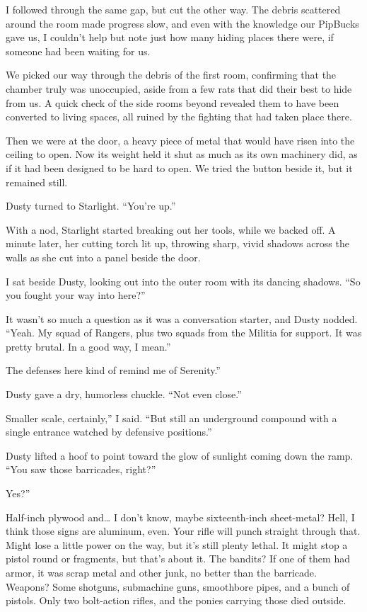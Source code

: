 I followed through the same gap, but cut the other way. The debris scattered around the room made progress slow, and even with the knowledge our PipBucks gave us, I couldn’t help but note just how many hiding places there were, if someone had been waiting for us.

We picked our way through the debris of the first room, confirming that the chamber truly was unoccupied, aside from a few rats that did their best to hide from us. A quick check of the side rooms beyond revealed them to have been converted to living spaces, all ruined by the fighting that had taken place there.

Then we were at the door, a heavy piece of metal that would have risen into the ceiling to open. Now its weight held it shut as much as its own machinery did, as if it had been designed to be hard to open. We tried the button beside it, but it remained still.

Dusty turned to Starlight. “You’re up.”

With a nod, Starlight started breaking out her tools, while we backed off. A minute later, her cutting torch lit up, throwing sharp, vivid shadows across the walls as she cut into a panel beside the door.

I sat beside Dusty, looking out into the outer room with its dancing shadows. “So you fought your way into here?”

It wasn’t so much a question as it was a conversation starter, and Dusty nodded. “Yeah. My squad of Rangers, plus two squads from the Militia for support. It was pretty brutal. In a good way, I mean.”

\leavevmode{}The defenses here kind of remind me of Serenity.”

Dusty gave a dry, humorless chuckle. “Not even close.”

\leavevmode{}Smaller scale, certainly,” I said. “But still an underground compound with a single entrance watched by defensive positions.”

Dusty lifted a hoof to point toward the glow of sunlight coming down the ramp. “You saw those barricades, right?”

\leavevmode{}Yes?”

\leavevmode{}Half-inch plywood and… I don’t know, maybe sixteenth-inch sheet-metal? Hell, I think those signs are aluminum, even. Your rifle will punch straight through that. Might lose a little power on the way, but it’s still plenty lethal. It might stop a pistol round or fragments, but that’s about it. The bandits? If one of them had armor, it was scrap metal and other junk, no better than the barricade. Weapons? Some shotguns, submachine guns, smoothbore pipes, and a bunch of pistols. Only two bolt-action rifles, and the ponies carrying those died outside.


